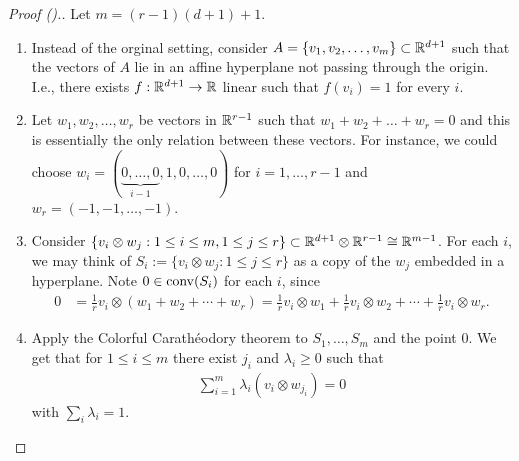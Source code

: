 \begin{proof}[Proof (\cite{sarkaria1992tverberg}).]
Let $m = (r-1)(d+1)+1$.

\begin{enumerate}
	\item Instead of the orginal setting, consider $A = \{v_1,v_2,\dotsc,v_m\} \subset \mathbb{R}^{d+1}$ such that the vectors of $A$ lie in an affine hyperplane not passing through the origin. I.e., there exists $f: \mathbb{R}^{d+1}\to \mathbb{R}$ linear such that $f(v_i) = 1$ for every $i$. 
	\item Let $w_1,w_2,\dotsc,w_r$ be vectors in $\mathbb{R}^{r-1}$ such that $w_1+w_2+\dotsc+w_r=0$ and this is essentially the only relation between these vectors. For instance, we could choose $w_i = (\underbrace{0,\dotsc,0}_{i-1},1,0,\dotsc,0)$ for $i=1,\dotsc,r-1$ and $w_r = (-1,-1,\dotsc,-1)$.
	\item Consider $\{v_i \otimes w_j: 1\leq i \leq m, 1\leq j \leq r\}\subset \mathbb{R}^{d+1}\otimes \mathbb{R}^{r-1}\cong \mathbb{R}^{m-1}$. For each $i$, we may think of $S_i:=\{v_i\otimes w_j:1\leq j\leq r\}$ as a copy of the $w_j$ embedded in a hyperplane. Note $0\in \operatorname{conv}(S_i)$ for each $i$, since
	\begin{align*}	
	0 &= \frac{1}{r}v_i \otimes (w_1+w_2+\dotsm+ w_r) = \frac{1}{r} v_i \otimes w_1 + \frac{1}{r}v_i\otimes w_2  +\dotsm + \frac{1}{r}v_i\otimes w_r.
	\end{align*}
	\item Apply the Colorful Carath\'eodory theorem to $S_1,\dotsc,S_m$ and the point $0$. We get that for $1\leq i\leq m$ there exist $j_i$ and $\lambda_i\geq 0$ such that
	\begin{align}	
	\sum_{i=1}^m \lambda_i (v_i\otimes w_{j_i})=0 \label{eq:Tv_conv_comb}
	\end{align}
	with $\sum_i \lambda_i=1$.


\end{enumerate}
\end{proof}
